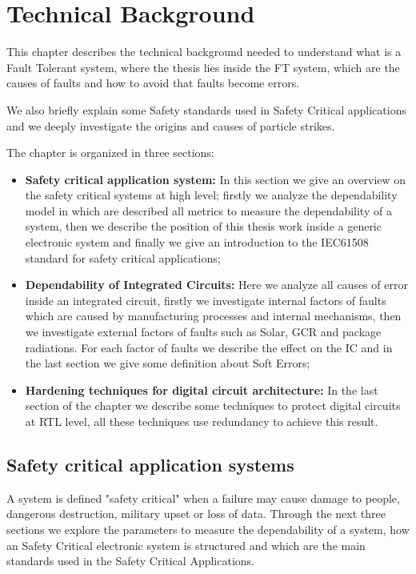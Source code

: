 \chapter{Technical Background}{
	This chapter describes the technical background needed to understand what is a Fault Tolerant system, where the thesis lies inside the FT system, which are the causes of faults and how to avoid that faults become errors.
	
	We also briefly explain some Safety standards used in Safety Critical applications and we deeply investigate the origins and causes of particle strikes.
	
	The chapter is organized in three sections:
	\begin{itemize}
	    \item \textbf{Safety critical application system:} In this section we give an overview on the safety critical systems at high level; firstly we analyze the dependability model in which are described all metrics to measure the dependability of a system, then we describe the position of this thesis work inside a generic electronic system and finally we give an introduction to the IEC61508 standard for safety critical applications;
	    \item \textbf{Dependability of Integrated Circuits: } Here we analyze all causes of error inside an integrated circuit, firstly we investigate internal factors of faults which are caused by manufacturing processes and internal mechanisms, then we investigate external factors of faults such as Solar, GCR and package radiations.
	    For each factor of faults we describe the effect on the IC and in the last section we give some definition about Soft Errors;
	    \item \textbf{Hardening techniques for digital circuit architecture:} In the last section of the chapter we describe some techniques to protect digital circuits at RTL level, all these techniques use redundancy to achieve this result. 
	\end{itemize}
	
	\section{Safety critical application systems}{
		A system is defined "safety critical" when a failure may cause damage to people, dangerous destruction, military upset or loss of data. Through the next three sections we explore the parameters to measure the dependability of a system, how an Safety Critical electronic system is structured and which are the main standards used in the Safety Critical Applications.
		
}}
